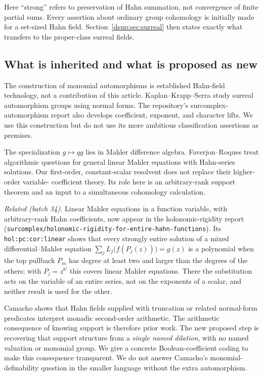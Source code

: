 \documentclass[11pt,oneside]{article}
\numberwithin{equation}{section}
\theoremstyle{definition}
\theoremstyle{remark}
\newcommand{\repo}[1]{\nolinkurl{#1}}%
\newcommand{\lbl}[1]{\nolinkurl{#1}}%
\begin{document}
Here ``strong'' refers to preservation of Hahn summation, not convergence
of finite partial sums. Every assertion about ordinary group cohomology
is initially made for a set-sized Hahn field. Section~\ref{dsup:sec:surreal}
then states exactly what transfers to the proper-class surreal fields.

\subsection{What is inherited and what is proposed as new}

The construction of monomial automorphisms is established Hahn-field
technology, not a contribution of this article. Kaplan--Krapp--Serra
\cite{KKS} study surreal automorphism groups using normal forms. The
repository's surcomplex-automorphism report \cite{RepoAut} also develops
coefficient, exponent, and character lifts. We use this construction but
do not use its more ambitious classification assertions as premises.

The specialization $g\mapsto qg$ lies in Mahler difference algebra.
Faverjon--Roques \cite{FR} treat algorithmic questions for general linear
Mahler equations with Hahn-series solutions. Our first-order,
constant-scalar resolvent does not replace their higher-order variable-
coefficient theory. Its role here is an arbitrary-rank support theorem
and an input to a simultaneous cohomology calculation.

\emph{Related (batch 34).} Linear Mahler equations in a function variable,
with arbitrary-rank Hahn coefficients, now appear in the holonomic-rigidity
report (\repo{surcomplex/holonomic-rigidity-for-entire-hahn-functions}). Its
\lbl{hol:pc:cor:linear} shows that every strongly entire solution of a mixed
differential--Mahler equation $\sum_jL_j\bigl(f(P_j(z))\bigr)=g(z)$ is a
polynomial when the top pullback $P_m$ has degree at least two and larger
than the degrees of the others; with $P_j=z^{b^j}$ this covers linear
Mahler equations. There the substitution acts on the variable of an entire
series, not on the exponents of a scalar, and neither result is used for the
other.

Camacho \cite{Camacho} shows that Hahn fields supplied with truncation or
related normal-form predicates interpret monadic second-order arithmetic.
The arithmetic consequence of knowing support is therefore prior work.
The new proposed step is recovering that support structure from a
\emph{single named dilation}, with no named valuation or monomial group.
We give a concrete Boolean-coefficient coding to make this consequence
transparent. We do not answer Camacho's monomial-definability question in
the smaller language without the extra automorphism.
\end{document}
